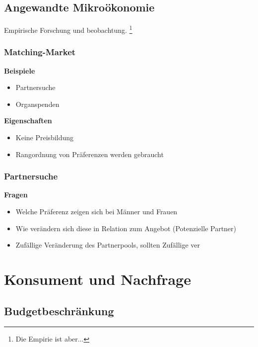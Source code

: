 \subsection{Angewandte Mikroökonomie}

Empirische Forschung und beobachtung. \footnote{Die Empirie ist aber...}

\subsubsection{Matching-Market}
\textbf{Beispiele}
\begin{itemize}
    \item Partnersuche
    \item Organspenden
\end{itemize}

\textbf{Eigenschaften}
\begin{itemize}
    \item Keine Preisbildung
    \item Rangordnung von Präferenzen werden gebraucht
\end{itemize}

\subsubsection{Partnersuche}

\textbf{Fragen}
\begin{itemize}
    \item Welche Präferenz zeigen sich bei Männer und Frauen
    \item Wie verändern sich diese in Relation zum Angebot (Potenzielle Partner)
    \item Zufällige Veränderung des Partnerpools, sollten Zufällige ver
\end{itemize}

\section{Konsument und Nachfrage}


\subsection{Budgetbeschränkung}


